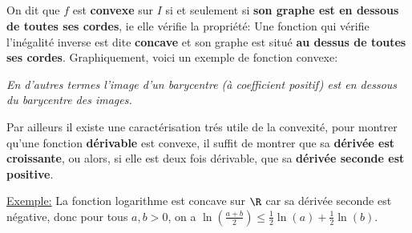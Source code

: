 \subsection*{}

On dit que \(f\) est \textbf{convexe} sur \(I\) si et seulement si \textbf{son graphe est en dessous de toutes ses cordes}, ie elle vérifie la propriété:
Une fonction qui vérifie l'inégalité inverse est dite \textbf{concave} et son graphe est situé \textbf{au dessus de toutes ses cordes}.
Graphiquement, voici un exemple de fonction convexe:
\begin{center}
\end{center}
\begin{center}
   \textit{
      En d'autres termes l'image d'un barycentre (à coefficient positif) est en dessous du barycentre des images.
   }
\end{center}
Par ailleurs il existe une caractérisation trés utile de la convexité, pour montrer qu'une fonction \textbf{dérivable} est convexe, il suffit de montrer que sa \textbf{dérivée est croissante}, ou alors, si elle est deux fois dérivable, que sa \textbf{dérivée seconde est positive}.\<

\underline{Exemple:}  La fonction logarithme est concave sur \(\R\) car sa dérivée seconde est négative, donc pour tous \(a, b > 0\), on a \(\ln(\frac{a + b}{2}) \leq \frac{1}{2}\ln(a) + \frac{1}{2}\ln(b)\).

